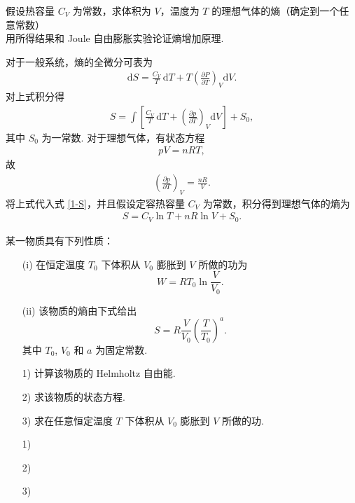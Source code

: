 \documentclass{assignment}
\begin{document}
\begin{prob}
    假设热容量 $C_V$ 为常数，求体积为 $V$，温度为 $T$ 的理想气体的熵（确定到一个任意常数）\\
    用所得结果和 Joule 自由膨胀实验论证熵增加原理.
\end{prob}
\begin{sol}
    对于一般系统，熵的全微分可表为
    \begin{align}
        \mathrm{d}S=\frac{C_V}{T}\,\mathrm{d}T+T\left(\frac{\partial P}{\partial T}\right)_V\mathrm{d}V.
    \end{align}
    对上式积分得
    \begin{align}
        \label{1-S}
        S=\int\left[\frac{C_V}{T}\,\mathrm{d}T+\left(\frac{\partial p}{\partial T}\right)_V\mathrm{d}V\right]+S_0,
    \end{align}
    其中 $S_0$ 为一常数.
    对于理想气体，有状态方程
    \begin{align}
        pV=nRT,
    \end{align}
    故
    \begin{align}
        \left(\frac{\partial p}{\partial T}\right)_V=\frac{nR}{V}.
    \end{align}
    将上式代入式 \eqref{1-S}，并且假设定容热容量 $C_V$ 为常数，积分得到理想气体的熵为
    \begin{align}
        S=C_V\ln T+nR\ln V+S_0.
    \end{align}
\end{sol}

\begin{prob}
    某一物质具有下列性质：
    \begin{itemize}
        \item[(i)] 在恒定温度 $T_0$ 下体积从 $V_0$ 膨胀到 $V$ 所做的功为
        \[
            W=RT_0\ln\frac{V}{V_0}.
        \]
        \item[(ii)] 该物质的熵由下式给出
        \[
            S=R\frac{V}{V_0}\left(\frac{T}{T_0}\right)^a.
        \]
        其中 $T_0$, $V_0$ 和 $a$ 为固定常数.
    \end{itemize}
    \begin{itemize}
        \item[1)] 计算该物质的 Helmholtz 自由能.
        \item[2)] 求该物质的状态方程.
        \item[3)] 求在任意恒定温度 $T$ 下体积从 $V_0$ 膨胀到 $V$ 所做的功.
    \end{itemize}
\end{prob}
\begin{sol}
    \begin{itemize}
        \item[1)] 
        \item[2)] 
        \item[3)] 
    \end{itemize}
\end{sol}
\end{document}

